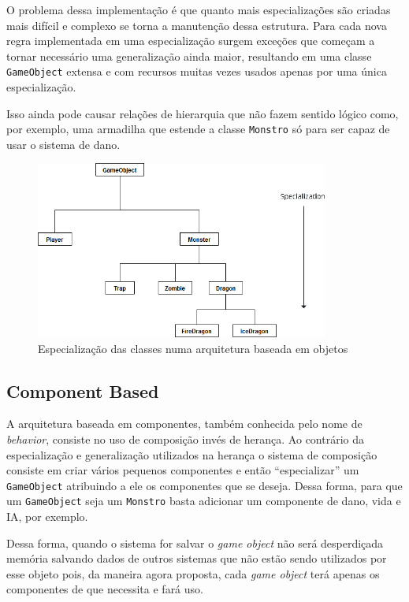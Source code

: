 \documentclass[12pt, 
openright, 
oneside, 
a4paper,    
brazil]{facom-ufu-abntex2}
\begin{document}
O problema dessa implementação é que quanto mais especializações são criadas mais difícil e complexo se torna a manutenção dessa estrutura. Para cada nova regra implementada em uma especialização surgem exceções que começam a tornar necessário uma generalização ainda maior, resultando em uma classe \texttt{GameObject} extensa e com recursos muitas vezes usados apenas por uma única especialização.

Isso ainda pode causar relações de hierarquia que não fazem sentido lógico como, por exemplo, uma armadilha que estende a classe \texttt{Monstro} só para ser capaz de usar o sistema de dano.


\begin{figure}[H]
	\centering
	\includegraphics[width=26em]{imagens/gameobject_specialization.png}
	\caption{Especialização das classes numa arquitetura baseada em objetos}
\end{figure}

\subsection{Component Based}
A arquitetura baseada em componentes, também conhecida pelo nome de \textit{behavior}, consiste no uso de composição invés de herança. Ao contrário da especialização e generalização utilizados na herança o sistema de composição consiste em criar vários pequenos componentes e então ``especializar'' um \texttt{GameObject} atribuindo a ele os componentes que se deseja. Dessa forma, para que um \texttt{GameObject} seja um \texttt{Monstro} basta adicionar um componente de dano, vida e IA, por exemplo.

Dessa forma, quando o sistema for salvar o \textit{game object} não será desperdiçada memória salvando dados de outros sistemas que não estão sendo utilizados por esse objeto pois, da maneira agora proposta, cada \textit{game object} terá apenas os componentes de que necessita e fará uso.
\end{document}
